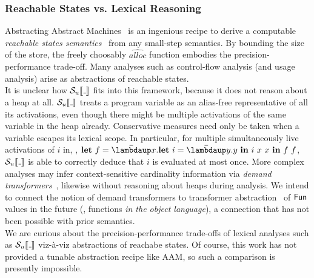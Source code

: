 \subsubsection*{Reachable States vs. Lexical Reasoning}
Abstracting Abstract Machines~\citep{aam} is an ingenious recipe to derive
a computable \emph{reachable states semantics}~\citep{Cousot:21} from any
small-step semantics.
By bounding the size of the store, the freely choosably
$\widehat{\mathit{alloc}}$ function embodies the precision-performance trade-off.
Many analyses such as control-flow analysis (and usage analysis) arise as
abstractions of reachable states. \\
It is unclear how $\semusg{\wild}$ fits into this framework, because it does not
reason about a heap at all.
$\semusg{\wild}$ treats a program variable as an alias-free representative of
all its activations, even though there might be multiple activations of the same
variable in the heap already.
Conservative measures need only be taken when a variable escapes its lexical
scope.
In particular, for multiple simultaneously live activations of $i$ in, \eg,
  ${\Let{f}{\Lam{x}{\Let{i}{\Lam{y}{y}}{i~x~x}}}{f~f}}$,
$\semusg{\wild}$ is able to correctly deduce that $i$ is evaluated at most once.
More complex analyses may infer context-sensitive cardinality
information via \emph{demand transformers}~\citep{cardinality-ext}, likewise
without reasoning about heaps during analysis.
We intend to connect the notion of demand transformers to transformer
abstraction~\citep{Cousot:21} of $\mathsf{Fun}$ values in the future (\ie, functions
\emph{in the object language}), a connection that has not been possible with
prior semantics. \\
We are curious about the precision-performance trade-offs of lexical analyses
such as $\semusg{\wild}$ viz-à-viz abstractions of reachabe states. Of course,
this work has not provided a tunable abstraction recipe like AAM, so such a
comparison is presently impossible.


